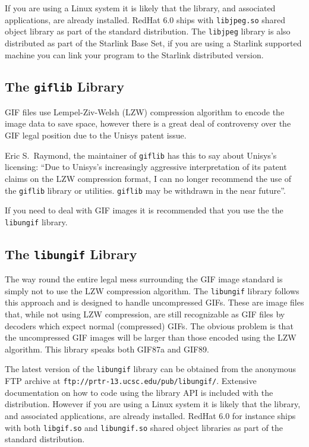 \documentclass[twoside,11pt]{article}
\newcommand{\htmladdnormallink}[2]{#1}
\newcommand{\htmlref}[2]{#1}
\newcommand{\xlabel}[1]{}
\begin{document}
If you are using a Linux system it is likely that the library, and associated applications, are already installed. RedHat 6.0 ships with {\tt libjpeg.so} shared object library as part of the standard distribution. The {\tt libjpeg} library is also distributed as part of the Starlink Base Set, if you are using a Starlink supported machine you can link your program to the Starlink distributed version.

\subsection{\xlabel{sc15_libgif}The {\tt giflib} Library\label{sc15_libgif}}

GIF files use Lempel-Ziv-Welsh (LZW) compression algorithm to encode the image data to save space, however there is a great deal of controversy over the GIF \htmlref{legal position}{sc15_giflegal}  due to the Unisys patent issue. 

Eric S.\ Raymond, the maintainer of {\tt giflib} has this to say about Unisys's licensing: ``Due to Unisys's increasingly aggressive interpretation of its \htmlref{patent claims}{sc15_giflegal} on the LZW compression format, I can no longer recommend the use of the {\tt giflib} library or utilities. {\tt giflib} may be withdrawn in the near future''.

If you need to deal with GIF images it is recommended that you use the the \htmlref{{\tt libungif}}{sc15_libungif} library.

\subsection{\xlabel{sc15_libungif}The {\tt libungif} Library\label{sc15_libungif}}

The way round the entire \htmlref{legal mess}{sc15_giflegal} surrounding the GIF image standard is simply not to use the LZW compression algorithm. The {\tt libungif} library follows this approach and is designed to handle uncompressed GIFs. These are image files that, while not using LZW compression, are still recognizable as GIF files by decoders which expect normal (compressed) GIFs. The obvious problem is that the uncompressed GIF images will be larger than those encoded using the LZW algorithm. This library speaks both GIF87a and GIF89. 

The latest version of the {\tt libungif} library can be obtained from the anonymous FTP archive at
\htmladdnormallink{{\tt ftp://prtr-13.ucsc.edu/pub/libungif/}}{ftp://prtr-13.ucsc.edu/pub/libungif/}. Extensive documentation on how to code using the library API is included with the distribution. However if you are using a Linux system it is likely that the library, and associated applications, are already installed.
RedHat 6.0 for instance ships with both {\tt libgif.so} and {\tt libungif.so} shared object libraries as part of the standard distribution.
\end{document}
